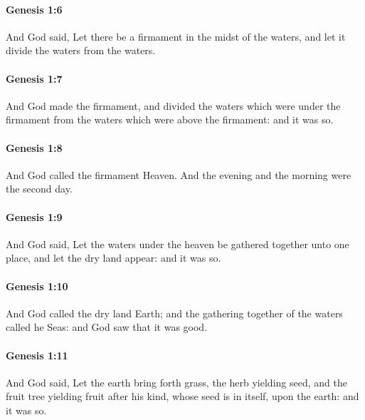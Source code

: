 		\paragraph{Genesis 1:6} %
			\label{GENESIS-1-6}

			And God said, Let there be a firmament in the midst of the waters, and let it divide the waters from the waters.

		\paragraph{Genesis 1:7} %
			\label{GENESIS-1-7}

			And God made the firmament, and divided the waters which were under the firmament from the waters which were above the firmament: and it was so. 

		\paragraph{Genesis 1:8} %
			\label{GENESIS-1-8}

			And God called the firmament Heaven. And the evening and the morning were the second day.

		\paragraph{Genesis 1:9} %
			\label{GENESIS-1-9}

			And God said, Let the waters under the heaven be gathered together unto one place, and let the dry land appear: and it was so. 

		\paragraph{Genesis 1:10} %
			\label{GENESIS-1-10}

			And God called the dry land Earth; and the gathering together of the waters called he Seas: and God saw that it was good. 

		\paragraph{Genesis 1:11} %
			\label{GENESIS-1-11}

			And God said, Let the earth bring forth grass, the herb yielding seed, and the fruit tree yielding fruit after his kind, whose seed is in itself, upon the earth: and it was so. 

